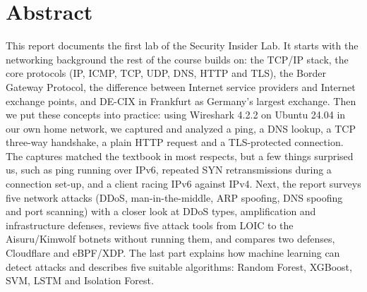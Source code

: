 \chapter*{Abstract}

This report documents the first lab of the Security Insider Lab. It starts with the networking background the rest of the course builds on: the TCP/IP stack, the core protocols (IP, ICMP, TCP, UDP, DNS, HTTP and TLS), the Border Gateway Protocol, the difference between Internet service providers and Internet exchange points, and DE-CIX in Frankfurt as Germany's largest exchange. Then we put these concepts into practice: using Wireshark 4.2.2 on Ubuntu 24.04 in our own home network, we captured and analyzed a ping, a DNS lookup, a TCP three-way handshake, a plain HTTP request and a TLS-protected connection. The captures matched the textbook in most respects, but a few things surprised us, such as ping running over IPv6, repeated SYN retransmissions during a connection set-up, and a client racing IPv6 against IPv4. Next, the report surveys five network attacks (DDoS, man-in-the-middle, ARP spoofing, DNS spoofing and port scanning) with a closer look at DDoS types, amplification and infrastructure defenses, reviews five attack tools from LOIC to the Aisuru/Kimwolf botnets without running them, and compares two defenses, Cloudflare and eBPF/XDP. The last part explains how machine learning can detect attacks and describes five suitable algorithms: Random Forest, XGBoost, SVM, LSTM and Isolation Forest.
